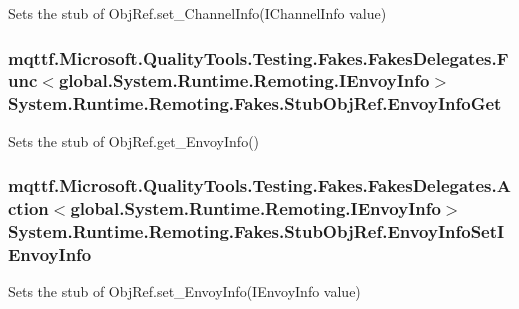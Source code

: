 Sets the stub of Obj\-Ref.\-set\-\_\-\-Channel\-Info(\-I\-Channel\-Info value)

\hypertarget{class_system_1_1_runtime_1_1_remoting_1_1_fakes_1_1_stub_obj_ref_aadc48a839981561b615681d43be029ba}{
\subsubsection[{Envoy\-Info\-Get}]{\setlength{\rightskip}{0pt plus 5cm}mqttf.\-Microsoft.\-Quality\-Tools.\-Testing.\-Fakes.\-Fakes\-Delegates.\-Func$<$global.\-System.\-Runtime.\-Remoting.\-I\-Envoy\-Info$>$ System.\-Runtime.\-Remoting.\-Fakes.\-Stub\-Obj\-Ref.\-Envoy\-Info\-Get}}\label{class_system_1_1_runtime_1_1_remoting_1_1_fakes_1_1_stub_obj_ref_aadc48a839981561b615681d43be029ba}


Sets the stub of Obj\-Ref.\-get\-\_\-\-Envoy\-Info()

\hypertarget{class_system_1_1_runtime_1_1_remoting_1_1_fakes_1_1_stub_obj_ref_a70c1dd8b70550e9fc0559e5837b61999}{
\subsubsection[{Envoy\-Info\-Set\-I\-Envoy\-Info}]{\setlength{\rightskip}{0pt plus 5cm}mqttf.\-Microsoft.\-Quality\-Tools.\-Testing.\-Fakes.\-Fakes\-Delegates.\-Action$<$global.\-System.\-Runtime.\-Remoting.\-I\-Envoy\-Info$>$ System.\-Runtime.\-Remoting.\-Fakes.\-Stub\-Obj\-Ref.\-Envoy\-Info\-Set\-I\-Envoy\-Info}}\label{class_system_1_1_runtime_1_1_remoting_1_1_fakes_1_1_stub_obj_ref_a70c1dd8b70550e9fc0559e5837b61999}


Sets the stub of Obj\-Ref.\-set\-\_\-\-Envoy\-Info(\-I\-Envoy\-Info value)

